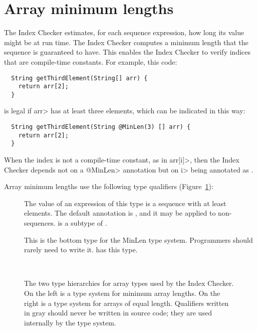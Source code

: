 \section{Array minimum lengths\label{index-minlen}}

The Index Checker estimates, for each sequence expression, how long its value
might be at run time.  The Index Checker computes a minimum length that
the sequence is guaranteed to have.  This enables the Index Checker to
verify indices that are compile-time constants.  For example, this code:

\begin{Verbatim}
  String getThirdElement(String[] arr) {
    return arr[2];
  }
\end{Verbatim}

\noindent
is legal if \<arr> has at least three elements, which can be indicated
in this way:

\begin{Verbatim}
  String getThirdElement(String @MinLen(3) [] arr) {
    return arr[2];
  }
\end{Verbatim}

When the index is not a compile-time constant, as in \<arr[i]>, then the
Index Checker depends not on a \<@MinLen> annotation but on \<i> being
annotated as
.

Array minimum lengths use the following type qualifiers
(Figure~\ref{fig-index-array-types}):

\begin{description}
\item[]
  The value of an expression of this type is a sequence with at least
   elements.  The default annotation is
  , and it may be applied to non-sequences.
   is a subtype of .
\item[]
  This is the bottom type for the MinLen type system.
  Programmers should rarely need to write it.
   has this type.
  \end{description}

\begin{figure}
\begin{center}
  \hfill
  ~~~~\hfill~~~~
  \hfill
\end{center}
  \caption{The two type hierarchies for array types used by the Index
    Checker.  On the left is a type system for minimum array lengths.  On
    the right is a type system for arrays of equal length.  Qualifiers
    written in gray should never be written in source code; they are used
    internally by the type system.}
  \label{fig-index-array-types}
\end{figure}

